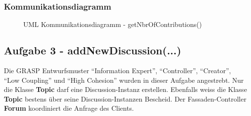 \documentclass[11pt,ngerman]{article}
\newcommand{\quotes}[1]{``#1''}
\begin{document}
         \subsubsection{Kommunikationsdiagramm}
          \begin{figure}[H]
             \centering
             \caption{UML Kommunikationsdiagramm - getNbrOfContributions()}
             \label{fig:UMLKommunikationsdiagramm_getNbrOfContributions}
         \end{figure}

     \subsection{Aufgabe 3 - addNewDiscussion(...)}
     Die GRASP Entwurfsmuster \quotes{Information Expert}, \quotes{Controller}, \quotes{Creator}, \quotes{Low Coupling} und \quotes{High Cohesion} wurden in dieser Aufgabe angestrebt. Nur die Klasse \textbf{Topic} darf eine Discussion-Instanz erstellen. Ebenfalls weiss die Klasse \textbf{Topic} bestens über seine Discussion-Instanzen Bescheid. Der Fassaden-Controller \textbf{Forum} koordiniert die Anfrage des Clients.
\end{document}
